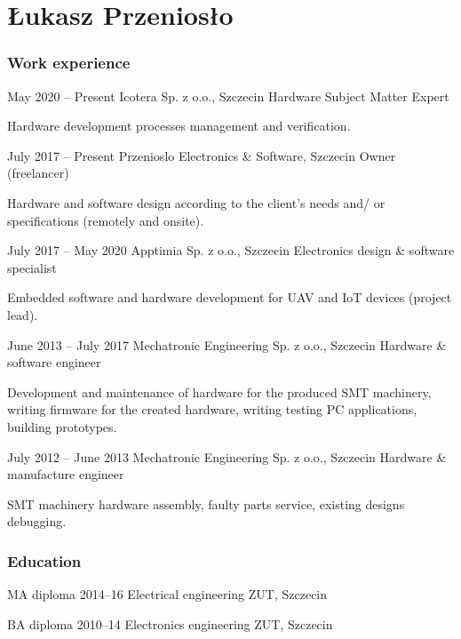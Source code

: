 \documentclass{tccv}
\begin{document}
\part{Łukasz Przeniosło}

\section{Work experience}

\begin{eventlist}

\item{May 2020 -- Present}
     {Icotera Sp. z o.o., Szczecin}
     {Hardware Subject Matter Expert}
     
Hardware development processes management and verification.

\item{July 2017 -- Present}
     {Przenioslo Electronics \& Software, Szczecin}
     {Owner (freelancer)}
     
Hardware and software design according to the client's needs and/ or specifications (remotely and onsite).

\item{July 2017 -- May 2020}
     {Apptimia Sp. z o.o., Szczecin}
     {Electronics design \& software specialist}
     
Embedded software and hardware development for UAV and IoT devices (project lead).

\item{June 2013 -- July 2017}
     {Mechatronic Engineering Sp. z o.o., Szczecin}
     {Hardware \& software engineer}
     
Development and maintenance of hardware for the produced SMT machinery, writing firmware for the created hardware, writing testing PC applications, building prototypes. 

\item{July 2012 -- June 2013}
     {Mechatronic Engineering Sp. z o.o., Szczecin}
     {Hardware \& manufacture engineer}

SMT machinery hardware assembly, faulty parts service, existing designs debugging. 

\end{eventlist}

\section{Education}

\begin{yearlist}

\item[MA diploma]{2014--16}
     {Electrical engineering}
     {ZUT, Szczecin}

\item[BA diploma]{2010--14}
     {Electronics engineering}
     {ZUT, Szczecin}

\end{yearlist}
\end{document}
